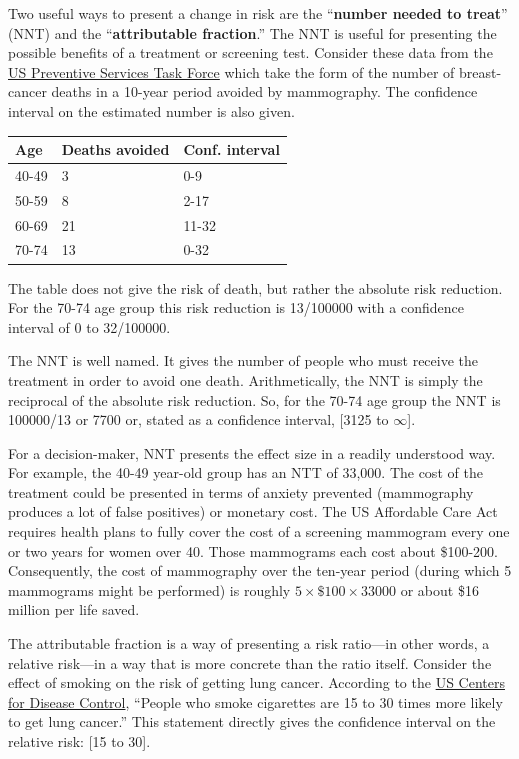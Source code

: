 \documentclass[
  letterpaper,
  DIV=11,
  numbers=noendperiod,
  oneside]{scrreprt}
\begin{document}
{\begin{footnotesize}
\begin{tcolorbox}
Two useful ways to present a change in risk are the ``\textbf{number
needed to treat}'' (NNT) and the ``\textbf{attributable fraction}.'' The
NNT is useful for presenting the possible benefits of a treatment or
screening test. Consider these data from the
\href{https://www.uspreventiveservicestaskforce.org/uspstf/document/RecommendationStatementFinal/breast-cancer-screening}{US
Preventive Services Task Force} which take the form of the number of
breast-cancer deaths in a 10-year period avoided by mammography. The
confidence interval on the estimated number is also given.

\begin{longtable}[]{@{}lll@{}}
\toprule()
Age & Deaths avoided & Conf. interval \\
\midrule()
\endhead
40-49 & 3 & 0-9 \\
50-59 & 8 & 2-17 \\
60-69 & 21 & 11-32 \\
70-74 & 13 & 0-32 \\
\bottomrule()
\end{longtable}

The table does not give the risk of death, but rather the absolute risk
reduction. For the 70-74 age group this risk reduction is 13/100000 with
a confidence interval of 0 to 32/100000.

The NNT is well named. It gives the number of people who must receive
the treatment in order to avoid one death. Arithmetically, the NNT is
simply the reciprocal of the absolute risk reduction. So, for the 70-74
age group the NNT is 100000/13 or 7700 or, stated as a confidence
interval, {[}3125 to \(\infty\){]}.

For a decision-maker, NNT presents the effect size in a readily
understood way. For example, the 40-49 year-old group has an NTT of
33,000. The cost of the treatment could be presented in terms of anxiety
prevented (mammography produces a lot of false positives) or monetary
cost. The US Affordable Care Act requires health plans to fully cover
the cost of a screening mammogram every one or two years for women over
40. Those mammograms each cost about \$100-200. Consequently, the cost
of mammography over the ten-year period (during which 5 mammograms might
be performed) is roughly \(5\times \$100 \times 33000\) or about \$16
million per life saved.

The attributable fraction is a way of presenting a risk ratio---in other
words, a relative risk---in a way that is more concrete than the ratio
itself. Consider the effect of smoking on the risk of getting lung
cancer. According to the
\href{https://www.cdc.gov/cancer/lung/basic_info/risk_factors.htm\#:~:text=People\%20who\%20smoke\%20cigarettes\%20are,the\%20risk\%20of\%20lung\%20cancer.}{US
Centers for Disease Control}, ``People who smoke cigarettes are 15 to 30
times more likely to get lung cancer.'' This statement directly gives
the confidence interval on the relative risk: {[}15 to 30{]}.


\end{tcolorbox}
\end{footnotesize}}
\end{document}
